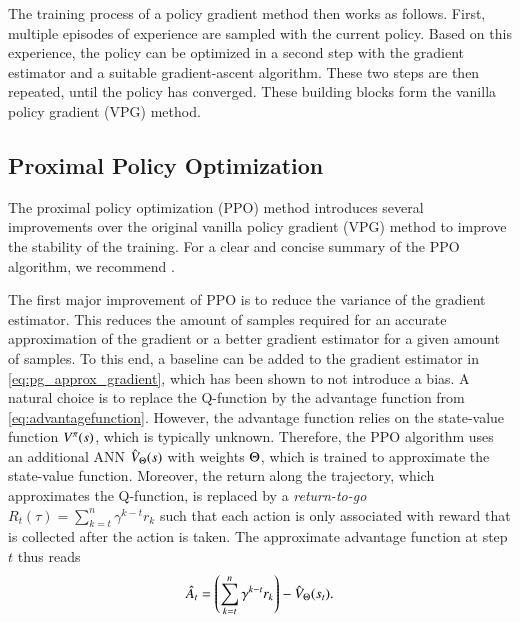 The training process of a policy gradient method then works as follows.
First, multiple episodes of experience are sampled with the current policy.
Based on this experience, the policy can be optimized in a second step with the gradient estimator and a suitable gradient-ascent algorithm.
These two steps are then repeated, until the policy has converged.
These building blocks form the vanilla policy gradient (VPG) method.

\subsection{Proximal Policy Optimization}
\label{sec:ppo}

The proximal policy optimization (PPO) method \cite{schulman2017proximal} introduces several improvements over the original vanilla policy gradient (VPG) method to improve the stability of the training.
For a clear and concise summary of the PPO algorithm, we recommend \cite{notter2021hierarchical}.

The first major improvement of PPO is to reduce the variance of the gradient estimator.
This reduces the amount of samples required for an accurate approximation of the gradient or a better gradient estimator for a given amount of samples.
To this end, a baseline can be added to the gradient estimator in \eqref{eq:pg_approx_gradient}, which has been shown to not introduce a bias.
A natural choice is to replace the Q-function by the advantage function from \eqref{eq:advantagefunction}.
However, the advantage function relies on the state-value function $V^{\pi}(s)$, which is typically unknown.
Therefore, the PPO algorithm uses an additional ANN $\hat{V}_{\Theta}(s)$ with weights $\Theta$, which is trained to approximate the state-value function.
Moreover, the return along the trajectory, which approximates the Q-function, is replaced by a \textit{return-to-go} $R_t(\tau) = \sum_{k=t}^n \gamma^{k-t} r_k$ such that each action is only associated with reward that is collected after the action is taken.
The approximate advantage function at step $t$ thus reads
\begin{equation}
  \hat{A}_t = \left(\sum_{k=t}^n \gamma^{k-t} r_k\right) - \hat{V}_{\Theta}(s_t).
  \label{eq:ppo_advantage}
\end{equation}

